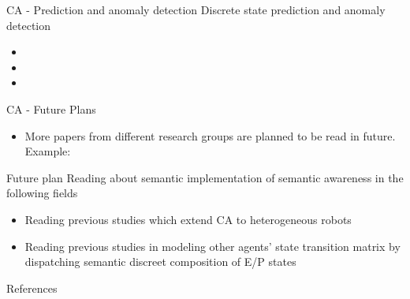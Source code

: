 \documentclass[unknownkeysallowed]{beamer}
\begin{document}
\begin{frame}{CA - Prediction and anomaly detection}
	Discrete state prediction and anomaly detection
	\begin{itemize}
		\item {}
		
		\item {}
		
		\item {}
	\end{itemize}
\end{frame}

\begin{frame}{CA - Future Plans}
	
	\begin{itemize}
		\item More papers from different research groups are planned to be read in future. Example:  
	\end{itemize}
\end{frame}

\begin{frame}{Future plan}
	Reading about semantic implementation of semantic awareness in the following fields
	\begin{itemize}
		\item Reading previous studies which extend CA to heterogeneous robots 
		\item Reading previous studies in modeling other agents' state transition matrix by dispatching semantic discreet composition of E/P states
	\end{itemize}
\end{frame}

\begin{frame}[allowframebreaks]{References}
	\printbibliography
\end{frame}
\end{document}
